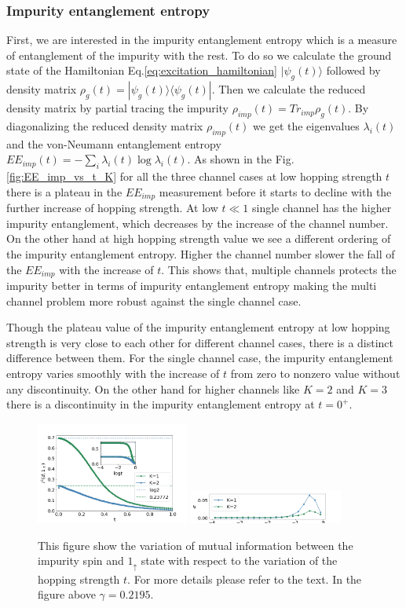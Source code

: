 \documentclass[reprint,prb,superscriptaddress]{revtex4-2}
\begin{document}
\subsubsection{Impurity entanglement entropy}
\noindent  First, we are interested in the impurity entanglement entropy which is a measure of entanglement of the impurity with the rest. To do so we calculate the ground state of the Hamiltonian Eq.\eqref{eq:excitation_hamiltonian} $|\psi_g(t)\rangle$ followed by density matrix $\rho_g(t)=|\psi_g(t)\rangle \langle\psi_g (t)|$. Then we calculate the reduced density matrix by partial tracing the impurity $\rho_{imp}(t)=Tr_{imp} \rho_g(t)$. By diagonalizing the reduced density matrix $\rho_{imp}(t)$ we get the eigenvalues $\lambda_i(t)$ and the von-Neumann entanglement entropy $EE_{imp}(t)=-\sum_i\lambda_i(t) \log \lambda_i(t)$. As shown in the Fig.\ref{fig:EE_imp_vs_t_K} for all the three channel cases at low hopping strength $t$ there is a plateau in the $EE_{imp}$ measurement before it starts to decline with the further increase of hopping strength. At low $t\ll 1$ single channel has the higher impurity entanglement, which decreases by the increase of the channel number. On the other hand at high hopping strength value we see a different ordering of the impurity entanglement entropy. Higher the channel number slower the fall of the $EE_{imp}$ with the increase of $t$. This shows that, multiple channels protects the impurity better in terms of impurity  entanglement entropy making the multi channel problem more robust against the single channel case. 
\par Though the plateau value of the impurity entanglement entropy at low hopping strength is very close to each other for different channel cases, there is a distinct difference between them. For the single channel case, the impurity entanglement entropy varies smoothly with the increase of $t$ from zero to nonzero value without any discontinuity. On the other hand for higher channels like $K=2$ and $K=3$ there is a discontinuity in the impurity entanglement entropy at $t=0^+$.


\begin{figure}[!htpb]
\includegraphics[width=0.45\textwidth]{plt/A_I2_ch12_['d','1_up']}
\includegraphics[width=0.45\textwidth]{plt/errorbar_A_I2_ch12_['d','1_up']}
\caption{This figure show the variation of mutual information between the impurity spin and $1_{\uparrow}$ state with respect to the variation of the hopping strength $t$. For more details please refer to the text. In the figure above $\gamma=0.2195$.}
\label{fig:MI_imp_1_vs_t_K}
\end{figure}
\end{document}
